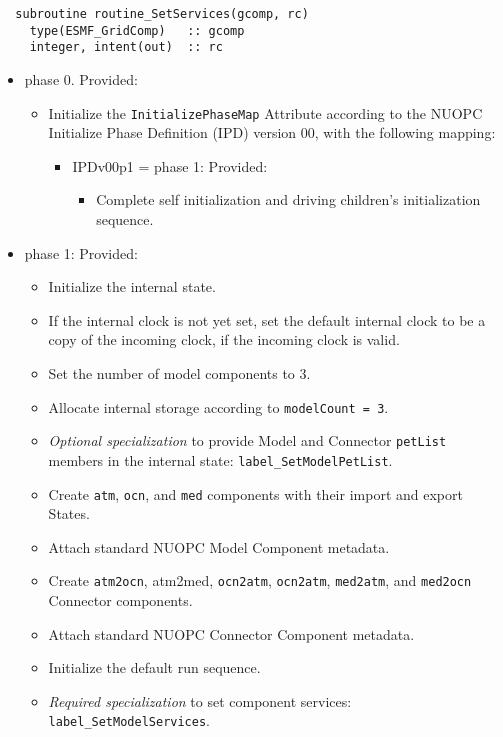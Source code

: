 \begin{verbatim}  subroutine routine_SetServices(gcomp, rc)
    type(ESMF_GridComp)   :: gcomp
    integer, intent(out)  :: rc
\end{verbatim}

\begin{itemize}
\item phase 0. {\sc Provided:}
  \begin{itemize}
  \item Initialize the {\tt InitializePhaseMap} Attribute according to the NUOPC Initialize Phase Definition (IPD) version 00, with the following mapping:
    \begin{itemize}
    \item IPDv00p1 = phase 1: {\sc Provided:} 
      \begin{itemize}
      \item Complete self initialization and driving children's initialization sequence.
      \end{itemize}
    \end{itemize}  
  \end{itemize}  
\item phase 1: {\sc Provided:}
  \begin{itemize}
  \item Initialize the internal state.
  \item If the internal clock is not yet set, set the default internal clock to be a copy of the incoming clock, if the incoming clock is valid.
  \item Set the number of model components to 3.
  \item Allocate internal storage according to {\tt modelCount = 3}.
  \item {\it Optional specialization} to provide Model and Connector {\tt petList} members in the internal state: {\tt label\_SetModelPetList}.
  \item Create {\tt atm}, {\tt ocn}, and {\tt med} components with their import and export States.
  \item Attach standard NUOPC Model Component metadata.
  \item Create {\tt atm2ocn}, {atm2med}, {\tt ocn2atm}, {\tt ocn2atm}, {\tt med2atm}, and {\tt med2ocn} Connector components.
  \item Attach standard NUOPC Connector Component metadata.
  \item Initialize the default run sequence.
  \item {\it Required specialization} to set component services: {\tt label\_SetModelServices}. 

\end{itemize}
\end{itemize}
